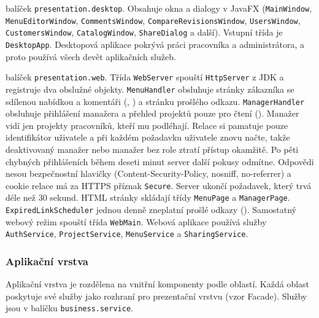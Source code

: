 \begin{description}[itemsep=2pt,style=unboxed]
  \item[Desktopová aplikace] balíček \texttt{presentation.desktop}. Obsahuje okna a dialogy v JavaFX (\texttt{MainWindow}, \texttt{MenuEditorWindow}, \texttt{CommentsWindow}, \texttt{CompareRevisionsWindow}, \texttt{UsersWindow}, \texttt{CustomersWindow}, \texttt{CatalogWindow}, \texttt{ShareDialog} a další). Vstupní třída je \texttt{DesktopApp}. Desktopová aplikace pokrývá práci pracovníka a administrátora, a proto používá všech devět aplikačních služeb.
  \item[Webová aplikace] balíček \texttt{presentation.web}. Třída \texttt{WebServer} spouští \texttt{HttpServer} z JDK a registruje dva obslužné objekty. \texttt{MenuHandler} obsluhuje stránky zákazníka se sdílenou nabídkou a komentáři (, ) a stránku prošlého odkazu. \texttt{ManagerHandler} obsluhuje přihlášení manažera a přehled projektů pouze pro čtení (). Manažer vidí jen projekty pracovníků, kteří mu podléhají. Relace si pamatuje pouze identifikátor uživatele a při každém požadavku uživatele znovu načte, takže deaktivovaný manažer nebo manažer bez role ztratí přístup okamžitě. Po pěti chybných přihlášeních během deseti minut server další pokusy odmítne. Odpovědi nesou bezpečnostní hlavičky (Content-Security-Policy, nosniff, no-referrer) a cookie relace má za HTTPS příznak \texttt{Secure}. Server ukončí požadavek, který trvá déle než 30 sekund. HTML stránky skládají třídy \texttt{MenuPage} a \texttt{ManagerPage}. \texttt{ExpiredLinkScheduler} jednou denně zneplatní prošlé odkazy (). Samostatný webový režim spouští třída \texttt{WebMain}. Webová aplikace používá služby \texttt{AuthService}, \texttt{ProjectService}, \texttt{MenuService} a \texttt{SharingService}.
\end{description}

\subsubsection*{Aplikační vrstva}

Aplikační vrstva je rozdělena na vnitřní komponenty podle oblastí. Každá oblast poskytuje své služby jako rozhraní pro prezentační vrstvu (vzor Facade). Služby jsou v balíčku \texttt{business.service}.

